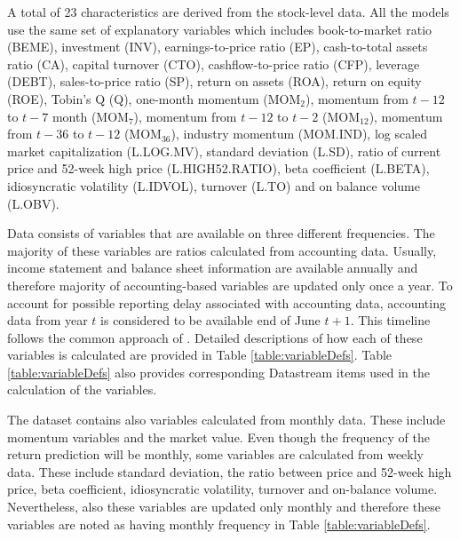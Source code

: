 \documentclass[12pt]{article}
\begin{document}
A total of 23 characteristics are derived from the stock-level data. All the models use the same set of explanatory variables which includes book-to-market ratio (BEME), investment (INV), earnings-to-price ratio (EP), cash-to-total assets ratio (CA), capital turnover (CTO), cashflow-to-price ratio (CFP), leverage (DEBT), sales-to-price ratio (SP), return on assets (ROA), return on equity (ROE), Tobin's Q (Q), one-month momentum (MOM$_2$), momentum from $t-12$ to $t-7$ month (MOM$_7$), momentum from $t-12$ to $t-2$ (MOM$_{12}$), momentum from $t-36$ to $t-12$ (MOM$_{36}$), industry momentum (MOM.IND), log scaled market capitalization (L.LOG.MV), standard deviation (L.SD), ratio of current price and 52-week high price (L.HIGH52.RATIO), beta coefficient (L.BETA), idiosyncratic volatility (L.IDVOL), turnover (L.TO) and on balance volume (L.OBV). \par

Data consists of variables that are available on three different frequencies. The majority of these variables are ratios calculated from accounting data.  Usually, income statement and balance sheet information are available annually and therefore majority of accounting-based variables are updated only once a year. To account for possible reporting delay associated with accounting data, accounting data from year $t$ is considered to be available end of June $t+1$. This timeline follows the common approach of \citet{FAMA19933}.\footnotemark {} Detailed descriptions of how each of these variables is calculated are provided in Table \ref{table:variableDefs}. Table \ref{table:variableDefs} also provides corresponding Datastream items used in the calculation of the variables. 

The dataset contains also variables calculated from monthly data. These include momentum variables and the market value. Even though the frequency of the return prediction will be monthly, some variables are calculated from weekly data. These include standard deviation, the ratio between price and 52-week high price, beta coefficient, idiosyncratic volatility, turnover and on-balance volume. Nevertheless, also these variables are updated only monthly and therefore these variables are noted as having monthly frequency in Table \ref{table:variableDefs}. \par
\end{document}
